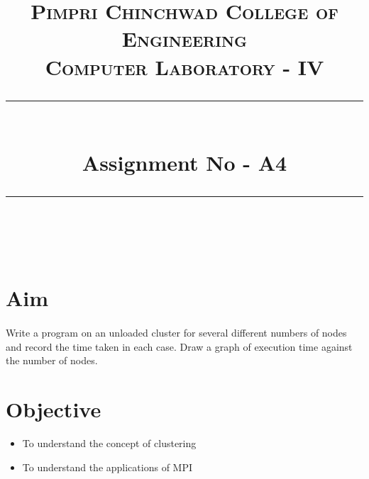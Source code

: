 \documentclass[a4paper,12pt]{article}
\title{
	\normalfont \normalsize 
	\textsc{Pimpri Chinchwad College of Engineering \\ 
		Computer Laboratory - IV} \\
	[10pt] 
	\rule{\linewidth}{0.5pt} \\[6pt] 
	\huge Assignment No - A4 \\
	\rule{\linewidth}{2pt}  \\[10pt]
}
\author{}
\date{\normalsize}
\newenvironment{codefont}{\fontfamily{ccr}\selectfont}{\par}
\begin{document}
\maketitle

\section{Aim}
	\paragraph{} Write a program on an unloaded cluster for several different numbers of nodes and record the time taken
	in each case. Draw a graph of execution time against the number of nodes.
	
\section{Objective}
	\begin{itemize}
		\item To understand the concept of clustering  
		\item To understand the applications of MPI  
		
	\end{itemize}
	
\end{document}
